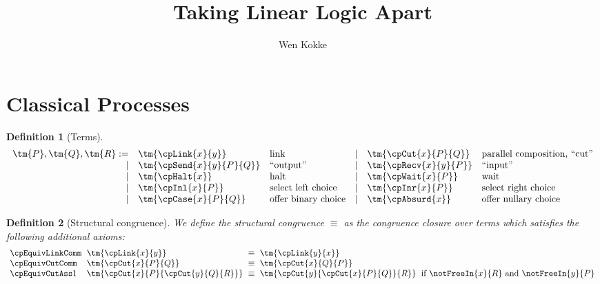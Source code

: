 \documentclass[submission,copyright,creativecommons]{eptcs}
\title{Taking Linear Logic Apart}
\author{%
  Wen Kokke
  \institute{University of Edinburgh\\ Edinburgh, Scotland}
  \email{wen.kokke@ed.ac.uk}}
\newtheorem{definition}{Definition}
\begin{document}
\maketitle

\begin{abstract}
\end{abstract}

\section{Classical Processes}

\begin{definition}[Terms]\label{def:cp-terms}
  \[
    \begin{array}{rllrll}
      \tm{P}, \tm{Q}, \tm{R}
           :=& \tm{\cpLink{x}{y}}       &\text{link}
      &  \mid& \tm{\cpCut{x}{P}{Q}}     &\text{parallel composition, ``cut''}
      \\ \mid& \tm{\cpSend{x}{y}{P}{Q}} &\text{``output''}
      &  \mid& \tm{\cpRecv{x}{y}{P}}    &\text{``input''}
      \\ \mid& \tm{\cpHalt{x}}          &\text{halt}
      &  \mid& \tm{\cpWait{x}{P}}       &\text{wait}
      \\ \mid& \tm{\cpInl{x}{P}}        &\text{select left choice}
      &  \mid& \tm{\cpInr{x}{P}}        &\text{select right choice}
      \\ \mid& \tm{\cpCase{x}{P}{Q}}    &\text{offer binary choice}
      &  \mid& \tm{\cpAbsurd{x}}        &\text{offer nullary choice}
    \end{array}
  \]
\end{definition}

\begin{definition}[Structural congruence]\label{def:cp-equiv}
  We define the structural congruence $\equiv$ as the congruence closure over
  terms which satisfies the following additional axioms:
  \begin{gather*}
    \setlength{\arraycolsep}{3pt}
    \begin{array}{llcll}
      \cpEquivLinkComm
      & \tm{\cpLink{x}{y}}
      & \equiv
      & \tm{\cpLink{y}{x}}
      \\
      \cpEquivCutComm
      & \tm{\cpCut{x}{P}{Q}}
      & \equiv
      & \tm{\cpCut{x}{Q}{P}}
      \\
      \cpEquivCutAss1
      & \tm{\cpCut{x}{P}{\cpCut{y}{Q}{R}}}
      & \equiv
      & \tm{\cpCut{y}{\cpCut{x}{P}{Q}}{R}}
      & \text{if }\notFreeIn{x}{R}\text{ and }\notFreeIn{y}{P}
    \end{array}
  \end{gather*}
\end{definition}
\end{document}

